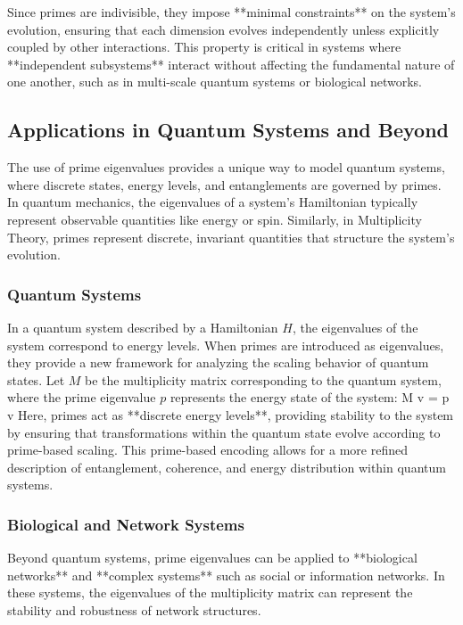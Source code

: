 \documentclass[12pt]{article}
\begin{document}
Since primes are indivisible, they impose **minimal constraints** on the system’s evolution, ensuring that each dimension evolves independently unless explicitly coupled by other interactions. This property is critical in systems where **independent subsystems** interact without affecting the fundamental nature of one another, such as in multi-scale quantum systems or biological networks.

\subsection{Applications in Quantum Systems and Beyond}

The use of prime eigenvalues provides a unique way to model quantum systems, where discrete states, energy levels, and entanglements are governed by primes. In quantum mechanics, the eigenvalues of a system’s Hamiltonian typically represent observable quantities like energy or spin. Similarly, in Multiplicity Theory, primes represent discrete, invariant quantities that structure the system’s evolution.

\subsubsection{Quantum Systems}

In a quantum system described by a Hamiltonian \( H \), the eigenvalues of the system correspond to energy levels. When primes are introduced as eigenvalues, they provide a new framework for analyzing the scaling behavior of quantum states. Let \( M \) be the multiplicity matrix corresponding to the quantum system, where the prime eigenvalue \( p \) represents the energy state of the system:
\]
M v = p v
\]
Here, primes act as **discrete energy levels**, providing stability to the system by ensuring that transformations within the quantum state evolve according to prime-based scaling. This prime-based encoding allows for a more refined description of entanglement, coherence, and energy distribution within quantum systems.

\subsubsection{Biological and Network Systems}

Beyond quantum systems, prime eigenvalues can be applied to **biological networks** and **complex systems** such as social or information networks. In these systems, the eigenvalues of the multiplicity matrix can represent the stability and robustness of network structures.
\end{document}
